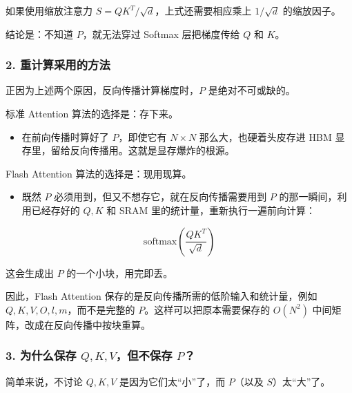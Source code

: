 如果使用缩放注意力 \(S = QK^T/\sqrt{d}\)，上式还需要相应乘上 \(1/\sqrt{d}\) 的缩放因子。

结论是：不知道 \(P\)，就无法穿过 Softmax 层把梯度传给 \(Q\) 和 \(K\)。

\hypertarget{ux91cdux8ba1ux7b97ux91c7ux7528ux7684ux65b9ux6cd5}{%
\subsubsection{2. 重计算采用的方法}\label{ux91cdux8ba1ux7b97ux91c7ux7528ux7684ux65b9ux6cd5}}

正因为上述两个原因，反向传播计算梯度时，\(P\) 是绝对不可或缺的。

标准 Attention 算法的选择是：存下来。

\begin{itemize}
\tightlist
\item
  在前向传播时算好了 \(P\)，即使它有 \(N \times N\) 那么大，也硬着头皮存进 HBM 显存里，留给反向传播用。这就是显存爆炸的根源。
\end{itemize}

Flash Attention 算法的选择是：现用现算。

\begin{itemize}
\tightlist
\item
{}
  既然 \(P\) 必须用到，但又不想存它，就在反向传播需要用到 \(P\) 的那一瞬间，利用已经存好的 \(Q,K\) 和 SRAM 里的统计量，重新执行一遍前向计算：
\end{itemize}

\[
\mathrm{softmax}\left(\frac{QK^T}{\sqrt{d}}\right)
\]

这会生成出 \(P\) 的一个小块，用完即丢。

因此，Flash Attention 保存的是反向传播所需的低阶输入和统计量，例如 \(Q,K,V,O,l,m\)，而不是完整的 \(P\)。这样可以把原本需要保存的 \(O(N^2)\) 中间矩阵，改成在反向传播中按块重算。

\hypertarget{ux4e3aux4ec0ux4e48ux4fddux5b58-qkvux4f46ux4e0dux4fddux5b58-p}{%
\subsubsection{\texorpdfstring{3. 为什么保存 \(Q,K,V\)，但不保存 \(P\)？}{3. 为什么保存 Q,K,V，但不保存 P？}}\label{ux4e3aux4ec0ux4e48ux4fddux5b58-qkvux4f46ux4e0dux4fddux5b58-p}}

简单来说，不讨论 \(Q,K,V\) 是因为它们太``小''了，而 \(P\)（以及 \(S\)）太``大''了。

